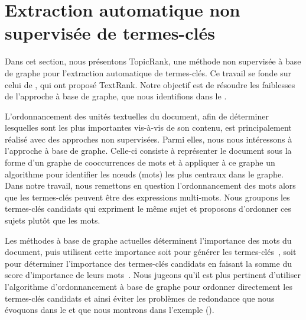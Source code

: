 
  \section{Extraction automatique non supervisée de termes-clés}
  \label{sec:main:domain_independent_keyphrase_extraction-unsupervised_automatic_keyphrase_extraction}
    Dans cet section, nous présentons TopicRank, une méthode non supervisée à
    base de graphe pour l'extraction automatique de termes-clés. Ce travail se
    fonde sur celui de , qui ont proposé TextRank.
    Notre objectif est de résoudre les faiblesses de l'approche à base de
    graphe, que nous identifions dans le
    .

    L'ordonnancement des unités textuelles du document, afin de déterminer
    lesquelles sont les plus importantes vis-à-vis de son contenu, est
    principalement réalisé avec des approches non supervisées. Parmi elles, nous
    nous intéressons à l'approche à base de graphe. Celle-ci consiste à
    représenter le document sous la forme d'un graphe de cooccurrences de mots
    et à appliquer à ce graphe un algorithme pour identifier les n\oe{}uds
    (mots) les plus centraux dans le graphe. Dans notre travail, nous remettons
    en question l'ordonnancement des mots alors que les termes-clés peuvent être
    des expressions multi-mots. Nous groupons les termes-clés candidats qui
    expriment le même sujet et proposons d'ordonner ces sujets plutôt que les
    mots.

    Les méthodes à base de graphe actuelles déterminent l'importance des mots du
    document, puis utilisent cette importance soit pour générer les
    termes-clés~\cite{mihalcea2004textrank}, soit pour déterminer l'importance
    des termes-clés candidats en faisant la somme du score d'importance de leurs
    mots~\cite{wan2008expandrank}. Nous jugeons qu'il est plus pertinent
    d'utiliser l'algorithme d'ordonnancement à base de graphe pour ordonner
    directement les termes-clés candidats et ainsi éviter les problèmes de
    redondance que nous évoquons dans le
     et que nous montrons dans
    l'exemple 
    ().
    
